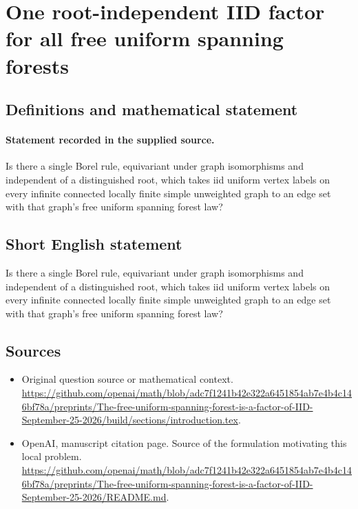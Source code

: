 \documentclass[11pt]{article}
\begin{document}
\section*{One root-independent IID factor for all free uniform spanning forests}\label{30007363}
\subsection{Definitions and mathematical statement}
\paragraph{Statement recorded in the supplied source.}
Is there a single Borel rule, equivariant under graph isomorphisms and independent of a distinguished root, which takes iid uniform vertex labels on every infinite connected locally finite simple unweighted graph to an edge set with that graph’s free uniform spanning forest law?
\subsection{Short English statement}
Is there a single Borel rule, equivariant under graph isomorphisms and independent of a distinguished root, which takes iid uniform vertex labels on every infinite connected locally finite simple unweighted graph to an edge set with that graph’s free uniform spanning forest law?
\subsection{Sources}
\begin{itemize}
\item[S1] Original question source or mathematical context.
\url{https://github.com/openai/math/blob/adc7f1241b42e322a6451854ab7e4b4c146bf78a/preprints/The-free-uniform-spanning-forest-is-a-factor-of-IID-September-25-2026/build/sections/introduction.tex}.
\item[S2] OpenAI, manuscript citation page. Source of the formulation motivating this local problem.
\url{https://github.com/openai/math/blob/adc7f1241b42e322a6451854ab7e4b4c146bf78a/preprints/The-free-uniform-spanning-forest-is-a-factor-of-IID-September-25-2026/README.md}.
\end{itemize}
\end{document}
